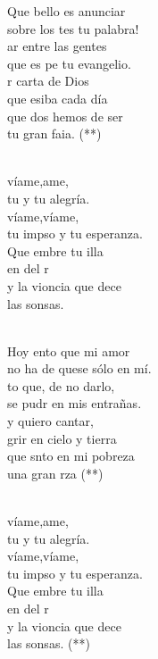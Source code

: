 \begin{cancion}%
	Que bello es anunciar \\
	sobre los tes tu palabra!\\
	ar entre las gentes \\
	que es pe tu evangelio.\\
	r carta de Dios\\
	que esiba cada día\\
	que dos hemos de ser \\
	tu gran faia. (**)\\\jump\\
	\begin{chorus}%
	víame,ame, \\
	tu y tu alegría.\\
	víame,víame,\\
	tu impso y tu esperanza.\\
	Que embre tu illa\\
	en  del r\\
	y la vioncia que dece \\
	las sonsas.\\
	\end{chorus}%
	\jump\\
	Hoy ento que mi amor \\
	no ha de quese sólo en mí.\\
	to que, de no darlo,\\
	se pudr en mis entrañas.\\
	y quiero cantar,\\
	grir en cielo y tierra\\
	que snto en mi pobreza \\
	una gran rza (**)\\\jump\\
	\begin{chorus}%
	víame,ame, \\
	tu y tu alegría.\\
	víame,víame,\\
	tu impso y tu esperanza.\\
	Que embre tu illa\\
	en  del r\\
	y la vioncia que dece \\
	las sonsas. (**)\\
	\end{chorus}%
	\jump\\
\end{cancion}%
